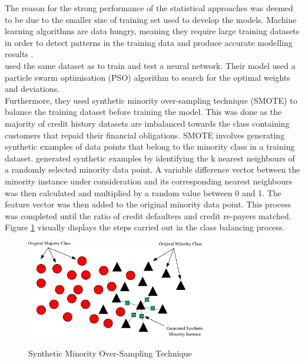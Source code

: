 The reason for the strong performance of the statistical approaches was deemed to be due to the smaller size of training set used to develop the models. Machine learning algorithms are data hungry, meaning they require large training datasets in order to detect patterns in the training data and produce accurate modelling results \parencite{DataHungry}.  \\

\textcite{NNShen} used the same dataset as \textcite{NNWest} to train and test a neural network. Their model used a particle swarm optimisation (PSO) algorithm to search for the optimal weights and deviations. \\

Furthermore, they used synthetic minority over-sampling technique (SMOTE) to balance the training dataset before  training the model. This was done as the majority of credit history datasets are imbalanced towards the class containing customers that repaid their financial obligations. SMOTE involves generating synthetic examples of data points that belong to the minority class in a training dataset. \textcite{NNShen} generated synthetic examples by identifying the k nearest neighbours of a randomly selected minority data point. A variable difference vector between the minority instance under consideration and its corresponding nearest neighbours was then calculated and multiplied by a random value between 0 and 1. The feature vector was then added to the original minority data point. This process was completed until the ratio of credit defaulters and credit re-payers matched. Figure \ref{fig:smote} visually displays the steps carried out in the class balancing process. 

\vspace{10pt}

\begin{figure}[!htb]
\centering
\includegraphics[width=0.7\textwidth]{images/smote.jpg}
\caption{Synthetic Minority Over-Sampling Technique}
\parencite{NNShen}
\label{fig:smote}
\end{figure}

